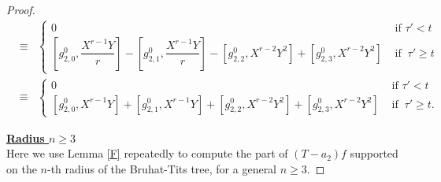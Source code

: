 \documentclass[11pt, reqno]{amsart}
\numberwithin{equation}{section}
\theoremstyle{definition}
\theoremstyle{remark}
\theoremstyle{definition}
\theoremstyle{remark}
\theoremstyle{remark}
\begin{document}
\begin{proof}
\begin{eqnarray*}
     &\equiv& \begin{cases}
0& \text{ if }\tau'<t\\
   \left [g_{2,0}^{0}, \dfrac{X^{r-1}Y}{r} \right]-\left[g_{2,1}^{0}, \dfrac{X^{r-1}Y}{r}\right] -\left[g_{2,2}^{0},  X^{r-2}Y^{2}\right]  +\left[g_{2,3}^{0},  X^{r-2}Y^{2}\right]    &\text{ if }\ \tau'\geq t
    \end{cases}\\
    &\equiv & 
    \begin{cases}
0 & \text{ if }\tau'<t\\
   \left [g_{2,0}^{0}, X^{r-1}Y \right]+\left[g_{2,1}^{0}, X^{r-1}Y\right] +\left[g_{2,2}^{0},  X^{r-2}Y^{2}\right]  +\left[g_{2,3}^{0},  X^{r-2}Y^{2}\right]  &\text{ if }\ \tau'\geq t.
    \end{cases}
\end{eqnarray*}

\noindent\textbf{\underline{Radius $n\geq3$}}\\
Here we use Lemma \ref{F} repeatedly to compute the part of $(T-a_2)f$ supported on the $n$-th radius of the Bruhat-Tits tree, for a general $n\geq 3$. %


\end{proof}
\end{document}
